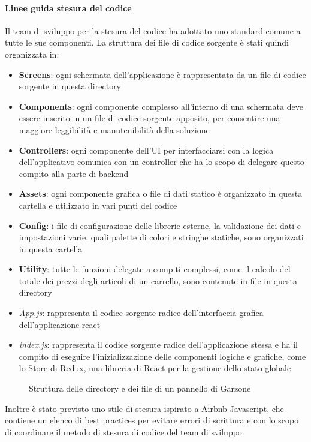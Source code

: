 \paragraph{Linee guida stesura del codice} Il team di sviluppo per la stesura del codice ha adottato uno standard comune a tutte le sue componenti. La struttura dei file di codice sorgente è stati quindi organizzata in:
\begin{itemize}
    \item \textbf{Screens}: ogni schermata dell'applicazione è rappresentata da un file di codice sorgente in questa directory
    \item \textbf{Components}: ogni componente complesso all'interno di una schermata deve essere inserito in un file di codice sorgente apposito, per consentire una maggiore leggibilità e manutenibilità della soluzione
    \item \textbf{Controllers}: ogni componente dell'UI per interfacciarsi con la logica dell'applicativo comunica con un controller che ha lo scopo di delegare questo compito alla parte di backend
    \item \textbf{Assets}: ogni componente grafica o file di dati statico è organizzato in questa cartella e utilizzato in vari punti del codice
    \item \textbf{Config}: i file di configurazione delle librerie esterne, la validazione dei dati e impostazioni varie, quali palette di colori e stringhe statiche, sono organizzati in questa cartella 
    \item \textbf{Utility}: tutte le funzioni delegate a compiti complessi, come il calcolo del totale dei prezzi degli articoli di un carrello, sono contenute in file in questa directory
    \item \textit{App.js}: rappresenta il codice sorgente radice dell'interfaccia grafica dell'applicazione react
    \item \textit{index.js}: rappresenta il codice sorgente radice dell'applicazione stessa e ha il compito di eseguire l'inizializzazione delle componenti logiche e grafiche, come lo Store di Redux, una libreria di React per la gestione dello stato globale
\end{itemize} 
\begin{figure}
\centering    
{}
\caption{Struttura delle directory e dei file di un pannello di Garzone}
\end{figure}
Inoltre è stato previsto uno stile di stesura ispirato a Airbnb Javascript\cite{AIRBNB}, che contiene un elenco di best practices per evitare errori di scrittura e con lo scopo di coordinare il metodo di stesura di codice del team di sviluppo.
